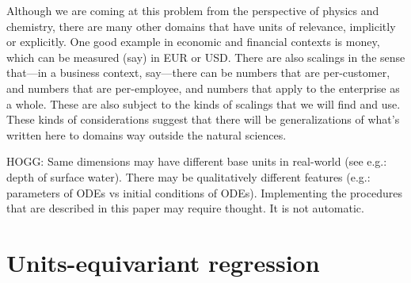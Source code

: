 \documentclass[12pt, letterpaper]{article}
\begin{document}
Although we are coming at this problem from the perspective of physics and chemistry, there are many other domains that have units of relevance, implicitly or explicitly.
One good example in economic and financial contexts is money, which can be measured (say) in EUR or USD.
There are also scalings in the sense that---in a business context, say---there can be numbers that are per-customer, and numbers that are per-employee, and numbers that apply to the enterprise as a whole.
These are also subject to the kinds of scalings that we will find and use.
These kinds of considerations suggest that there will be generalizations of what's written here to domains way outside the natural sciences.

HOGG: Same dimensions may have different base units in real-world (see e.g.: depth of surface water). There may be qualitatively different features (e.g.: parameters of ODEs vs initial conditions of ODEs). Implementing the procedures that are described in this paper may require thought. It is not automatic. 

\section{Units-equivariant regression}\label{sec:method}
\end{document}
